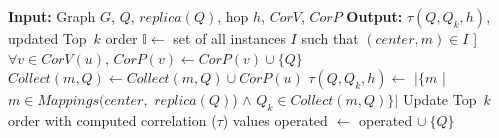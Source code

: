 \documentclass[MTech]{iitddiss}
\begin{document}
\begin{algorithm}%
  \nonl {}\;
		\dontprintsemicolon
		\nonl \textbf{Input:} Graph $G$, $Q$, $replica(Q)$, hop $h$, $CorV$, $CorP$\;
		\nonl \textbf{Output:} $\tau({Q,Q_{k},h})$, updated {\sf Top\ $k$} order\;
		{
      $\mathbb{I}\leftarrow$ {set of all instances $I$ such that $(center, m)\in I$}\;
      \nonl [[Found Using \textsc{FindAllInstancesExact}]] \;
			{
				$\forall v \in CorV(u)$, $CorP(v)\leftarrow CorP(v) \cup \{Q\}$\;
				$Collect(m, Q) \leftarrow Collect(m, Q) \cup CorP(u)$\;	 
			}						
		}
		{
			$\tau(Q, Q_k, h)\leftarrow$  $|\{m$ | $m\in Mappings(center,$ $replica(Q)$) $\wedge$ $Q_k\in Collect(m, Q)\}|$\;
		}
		Update {\sf Top\ $k$} order with computed correlation ($\tau$) values\;
		{\sf operated} $\leftarrow$ {\sf operated} $\cup \ \{Q\}$\;
\end{algorithm}




\vspace{-2mm}
{\scriptsize

}
\end{document}
